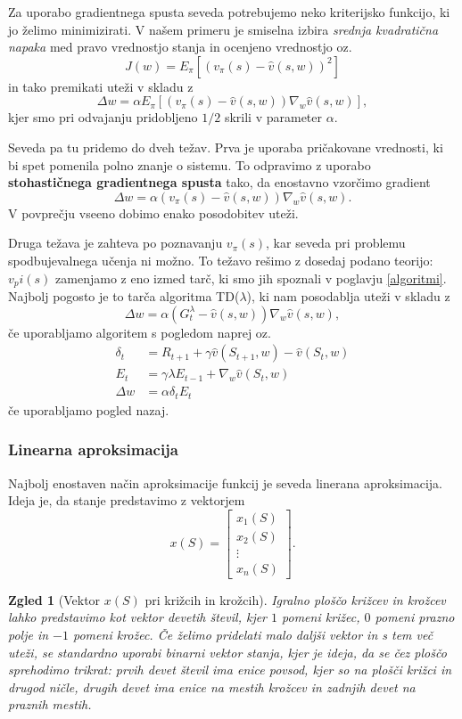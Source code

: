 \documentclass[12pt,a4paper]{amsart}
\theoremstyle{definition} %
\theoremstyle{plain} %
\newtheorem{zgled}[definicija]{Zgled}
\begin{document}
Za uporabo gradientnega spusta seveda potrebujemo neko kriterijsko funkcijo, ki jo želimo minimizirati. 
V našem primeru je smiselna izbira \textit{srednja kvadratična napaka} med pravo vrednostjo stanja in 
ocenjeno vrednostjo oz. 
$$
J(w) = E_\pi [(v_\pi(s) - \hat{v}(s, w))^2]
$$
in tako premikati uteži v skladu z 
$$
\Delta w = \alpha E_\pi [(v_\pi(s) - \hat{v}(s, w)) \nabla_w \hat{v}(s, w)], 
$$
kjer smo pri odvajanju pridobljeno $1/2$ skrili v parameter $\alpha$.

Seveda pa tu pridemo do dveh težav. Prva je uporaba pričakovane vrednosti, ki bi spet pomenila polno 
znanje o sistemu. To odpravimo z uporabo \textbf{stohastičnega gradientnega spusta} tako, da 
enostavno vzorčimo gradient 
$$
\Delta w = \alpha (v_\pi(s) - \hat{v}(s, w)) \nabla_w \hat{v}(s, w). 
$$
V povprečju vseeno dobimo enako posodobitev uteži. 

Druga težava je zahteva po poznavanju $v_\pi(s)$, kar seveda pri problemu spodbujevalnega učenja ni 
možno. To težavo rešimo z dosedaj podano teorijo: $v_pi(s)$ zamenjamo z eno izmed tarč, ki smo jih 
spoznali v poglavju \ref{algoritmi}. Najbolj pogosto je to tarča algoritma TD($\lambda$), ki nam 
posodablja uteži v skladu z 
$$
\Delta w = \alpha (G_t^\lambda - \hat{v}(s, w)) \nabla_w \hat{v}(s, w), 
$$
če uporabljamo algoritem s pogledom naprej oz. 
\begin{align*}
    \delta_t &= R_{t+1} + \gamma \hat{v}(S_{t+1}, w) - \hat{v}(S_t, w) \\
    E_t &= \gamma \lambda E_{t-1} + \nabla_w \hat{v}(S_t, w) \\
    \Delta w &= \alpha \delta_t E_t
\end{align*}
če uporabljamo pogled nazaj.

\subsubsection{Linearna aproksimacija}
Najbolj enostaven način aproksimacije funkcij je seveda linerana aproksimacija. Ideja je, da stanje 
predstavimo z vektorjem 
$$
x(S) = \begin{bmatrix}
    x_{1}(S) \\
    x_{2}(S) \\
    \vdots \\
    x_{n}(S)
  \end{bmatrix}.
$$

\begin{zgled}[Vektor $x(S)$ pri križcih in krožcih]
\label{vektor-ttt}
    Igralno ploščo križcev in krožcev lahko predstavimo kot vektor devetih števil, kjer 
    $1$ pomeni križec, $0$ pomeni prazno polje in $-1$ pomeni krožec. Če želimo pridelati malo daljši 
    vektor in s tem več uteži, se standardno uporabi binarni vektor stanja, kjer je ideja, da se čez 
    ploščo sprehodimo trikrat: prvih devet števil ima enice povsod, kjer so na plošči križci in drugod 
    ničle, drugih devet ima enice na mestih krožcev in zadnjih devet na praznih mestih.
\end{zgled}
\end{document}
